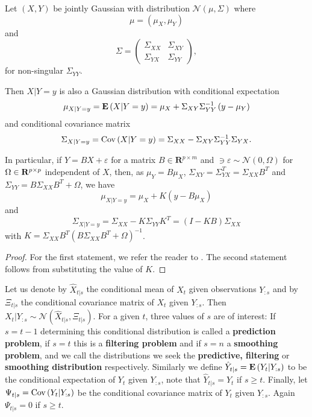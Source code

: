 \begin{lemma}
    \label{lem:gaussian_conditional}
    Let $(X,Y)$ be jointly Gaussian with distribution $\mathcal N \left( \mu, \Sigma \right)$ where 
    $$
    \mu = \left(\mu_{X}, \mu_{Y}\right)
    $$
    and 
    $$
    \Sigma = \begin{pmatrix}
        \Sigma_{XX} & \Sigma_{XY} \\
        \Sigma_{YX} & \Sigma_{YY}
    \end{pmatrix},
    $$
    for non-singular $\Sigma_{YY}$. 
    
    Then $X|Y = y$ is also a Gaussian distribution with conditional expectation
    $$
    \mu_{X|Y = y} = \mathbf E \left( X | Y = y \right) = \mu_{X} + \Sigma_{XY}\Sigma_{YY}^{-1} \left( y - \mu_{Y} \right)
    $$
    and conditional covariance matrix 
    $$
    \Sigma_{X| Y =y} = \text{Cov} \left( X | Y = y \right) = \Sigma_{XX} - \Sigma_{XY} \Sigma_{YY}^{-1} \Sigma_{YX}.
    $$
    
    In particular, if $Y = BX + \varepsilon$ for a matrix $B \in \mathbf R^{p\times m}$ and $\ni \varepsilon \sim \mathcal N(0, \Omega)$ for $\Omega \in \mathbf R^{p\times p}$ independent of $X$, then, as 
    $\mu_Y = B \mu_{X}$, $\Sigma_{XY} = \Sigma_{YX}^T = \Sigma_{XX}B^{T}$ and $\Sigma_{YY} = B \Sigma_{XX} B^{T} + \Omega$, we have
    $$
        \mu_{X|Y = y} = \mu_{X} + K (y - B \mu_{X})
    $$
    and 
    $$
    \Sigma_{X|Y = y} = \Sigma_{XX} - K \Sigma_{YY} K^{T} = \left( I  -  KB \right) \Sigma_{XX}
    $$
    with $K = \Sigma_{XX}B^{T} \left( B \Sigma_{XX}B^{T} + \Omega \right)^{-1}$.
\end{lemma}
\begin{proof}
    For the first statement, we refer the reader to \cite[Chapter 4, Lemma 1]{Durbin2012Time}. The second statement follows from substituting the value of $K$.

\end{proof}

Let us denote by $\hat X_{t | s}$ the conditional mean of $X_{t}$ given observations $Y_{:s}$ and by $\Xi_{t | s}$ the conditional covariance matrix of $X_{t}$ given $Y_{:s}$. Then $X_{t} | Y_{:s} \sim \mathcal N \left( \hat X_{t|s}, \Xi_{t|s} \right)$. For a given $t$, three values of $s$ are of interest: If $s = t - 1$ determining this conditional distribution is called a \textbf{prediction problem}, if $s = t$ this is a \textbf{filtering problem} and if $s = n$ a \textbf{smoothing problem}, and we call the distributions we seek the \textbf{predictive, filtering} or \textbf{smoothing distribution} respectively. 
Similarly we define $\hat Y_{t|s} = \mathbf E \left( Y_{t} \middle| Y_{:s} \right)$ to be the conditional expectation of $Y_{t}$ given $Y_{:s}$, note that $\hat Y_{t|s} = Y_{t}$ if $s \geq t$. Finally, let $\Psi_{t|s} = \text{Cov} \left( Y_{t} | Y_{:s} \right)$ be the conditional covariance matrix of $Y_{t}$ given $Y_{:s}$. Again $\Psi_{t|s} = 0$ if $s \geq t$. 

